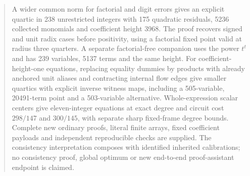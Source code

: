 \begin{abstract}
A wider common norm for factorial and digit errors gives an explicit
quartic in 238 unrestricted integers with 175 quadratic residuals,
5236 collected monomials and coefficient height 3968. The proof recovers
signed and unit radix cases before positivity, using a factorial fixed
point valid at radius three quarters. A separate factorial-free companion
uses the power $t^t$ and has 239 variables, 5137 terms and the same height.
For coefficient-height-one equations, replacing equality dummies by
products with already anchored unit aliases and contracting internal
flow edges give smaller quartics with explicit inverse witness maps,
including a 505-variable, 20491-term point and a 503-variable alternative.
Whole-expression scalar centers give eleven-integer equations at exact
degree and circuit cost $298/147$ and $300/145$, with separate sharp
fixed-frame degree bounds. Complete new ordinary proofs, literal finite
arrays, fixed coefficient payloads and independent reproducible checks
are supplied. The consistency interpretation composes with identified
inherited calibrations; no consistency proof, global optimum or new
end-to-end proof-assistant endpoint is claimed.
\end{abstract}
